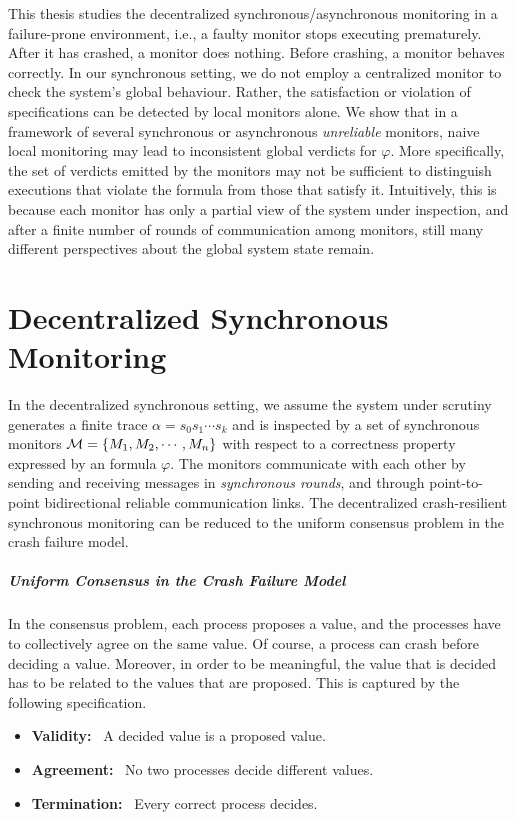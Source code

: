 This thesis studies the decentralized synchronous/asynchronous monitoring in a 
failure-prone environment, i.e., a faulty monitor stops executing prematurely. 
After it has crashed, a monitor does nothing. Before crashing, a monitor 
behaves correctly. In our synchronous setting, we do not employ a centralized 
monitor to check the system's global behaviour. Rather, the satisfaction or 
violation of specifications can be detected by local monitors alone. We show 
that in a framework of several synchronous or asynchronous {\em unreliable} 
monitors, naive local monitoring may lead to inconsistent global verdicts for 
$\varphi$. More specifically, the set of verdicts emitted by the monitors may 
not be sufficient to distinguish executions that violate the formula from those 
that satisfy it. Intuitively, this is because each monitor has only a partial 
view of the system under inspection, and after a finite number of rounds of 
communication among monitors, still many different perspectives about the global 
system state remain.

\section{Decentralized Synchronous Monitoring}
\label{sec:introDSM}

In the decentralized synchronous setting, we assume the system under scrutiny 
generates a finite trace $\alpha = s_0 s_1 \cdots s_k$ and is inspected by a set 
of synchronous monitors $\mathcal{M} =\{M_1, M_2, \cdots , M_n\}$ with respect to 
a correctness property expressed by an \LTL formula $\varphi$. The monitors 
communicate with each other by sending and receiving messages in 
{\em synchronous rounds}, and through point-to-point bidirectional reliable 
communication links. The decentralized crash-resilient synchronous monitoring 
can be reduced to the uniform consensus problem in the crash failure 
model.

\subparagraph{Uniform Consensus in the Crash Failure Model}

In the consensus problem, each process proposes a value, and the processes 
have to collectively agree on the same value. Of course, a process can crash 
before deciding a value. Moreover, in order to be meaningful, the value that is 
decided has to be related to the values that are proposed. This is captured by 
the following specification.

\begin{itemize}
\item {\bf Validity:} \ A decided value is a proposed value.

\item {\bf Agreement:} \ No two processes decide different values.

\item {\bf Termination:} \ Every correct process decides.
\end{itemize}

